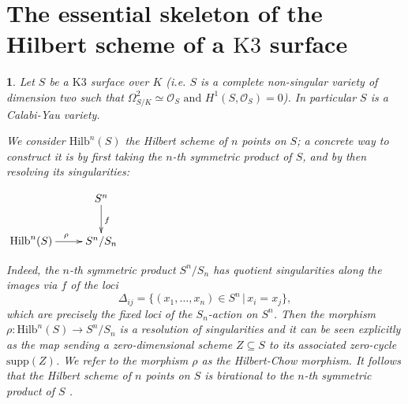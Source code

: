 \documentclass{amsart}%
\numberwithin{equation}{subsection}
\theoremstyle{plain2}
\theoremstyle{definition2}
\theoremstyle{stepstyle}
\theoremstyle{point}
\theoremstyle{subpoint}
\newtheorem{subpoint}[equation]{}%
\newcommand{\spa}[1]{\begin{subpoint}#1\end{subpoint}}           %
\newcommand{\caO}{\ensuremath{\mathcal{O}}}
\newcommand{\Hilb}{\ensuremath{\mathrm{Hilb}}}
\begin{document}
\section{The essential skeleton of the Hilbert scheme of a $\text{K3}$ surface} \label{sect essential sk Hilb}

\spa{Let $S$ be a $\text{K}3$ surface over $K$ (i.e. $S$ is a complete non-singular variety of dimension two such that $\Omega_{S/K}^2 \simeq \caO_S \text{ and } H^1(S,\caO_S) = 0$). In particular $S$ is a Calabi-Yau variety.

We consider $\Hilb^n(S)$ the Hilbert scheme of $n$ points on $S$; a concrete way to construct it is by first taking the $n$-th symmetric product of $S$, and by then resolving its singularities:
\begin{center}
$ \xymatrix{
& S^n \ar[d]^{f} \\
\Hilb^n(S) \ar[r]^{\rho} & S^n/S_n\\
}$
\end{center} Indeed, the $n$-th symmetric product $S^n/S_n$ has quotient singularities along the images via $f$ of the loci $$\Delta_{ij}= \{(x_1,\ldots,x_n) \in S^n \,|\, x_i=x_j\},$$ which are precisely the fixed loci of the $S_n$-action on $S^n$. Then the morphism $\rho: \Hilb^n(S) \rightarrow S^n/S_n$ is a resolution of singularities and it can be seen explicitly as the map sending a zero-dimensional scheme $Z \subseteq S$ to its associated zero-cycle $\text{supp}(Z)$. We refer to the morphism $\rho$ as the Hilbert-Chow morphism. It follows that the Hilbert scheme of $n$ points on $S$ is birational to the $n$-th symmetric product of $S$ \cite{Fogarty}. 
}
\end{document}
